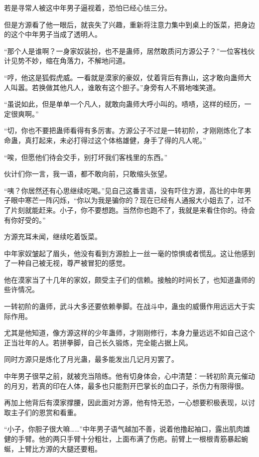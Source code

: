 
\begin{this_body}

若是寻常人被这中年男子逼视着，恐怕已经心怯三分。

但是方源看了他一眼后，就丧失了兴趣，重新将注意力集中到桌上的饭菜，把身边的这个中年男子当成了透明人。

“那个人是谁啊？一身家奴装扮，也不是蛊师，居然敢质问方源公子？”一位客栈伙计见势不妙，缩在角落力，不解地问道。

“哼，他这是狐假虎威。一看就是漠家的豪奴，仗着背后有靠山，这才敢向蛊师大人叫嚣。若换做其他凡人，谁敢有这个胆子。”身旁有人不屑地嗤笑道。

“虽说如此，但是单单一个凡人，就敢向蛊师大呼小叫的。啧啧，这样的经历，一定很爽啊。”

“切，你也不要把蛊师看得有多厉害。方源公子不过是一转初阶，才刚刚炼化了本命蛊，真打起来，未必打得过这个体格雄健，身手了得的凡人呢。”

“唉，但愿他们待会交手，别打坏我们客栈里的东西。”

伙计们你一言，我一语，都不敢向前，只敢缩头张望。

“咦？你居然还有心思继续吃喝。”见自己这番言语，没有吓住方源，高壮的中年男子眼中寒芒一阵闪烁，“你以为我是骗你的？现在已经有人通报大小姐去了，过不了片刻就能赶来。小子，你不要想跑。当然你也跑不了，我就是来看住你的。待会有你好受的。”

方源充耳未闻，继续吃着饭菜。

中年家奴皱起了眉头，他没有看到方源脸上一丝一毫的惊惧或者慌乱。这让他感到了一种自己被无视，尊严被冒犯的感觉。

他在漠家当了十几年的家奴，颇受主子们的信赖。接触的时间长了，也知道蛊师的些许情况。

一转初阶的蛊师，武斗大多还要依赖拳脚。在战斗中，蛊虫的威慑作用远远大于实际作用。

尤其是他知道，像方源这样的少年蛊师，才刚刚修行，本身力量远远不如自己这个正当壮年的人。若拼拳脚，自己长久锻炼，完全能占据上风。

同时方源只是炼化了月光蛊，最多能发出几记月刃罢了。

中年男子很早之前，就被充当陪练。他有切身体会，心中清楚：一转初阶真元催动的月刃，若真的印在人体，最多也只能割开巴掌长的血口子，杀伤力有限得很。

再加上他背后有漠家撑腰，因此面对方源，他有恃无恐，一心想要积极表现，以讨取主子们的恩赏和看重。

“小子，你胆子很大嘛……”中年男子语气越加不善，说着他撸起袖口，露出肌肉雄健的手臂。他的两只手臂十分粗壮，上面布满了伤疤。前臂上一根根青筋暴起蜿蜒，上臂比方源的大腿还要粗。


\end{this_body}
